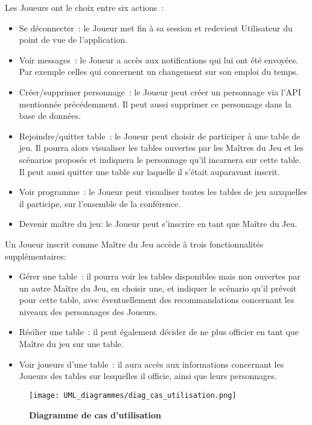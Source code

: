 \documentclass[11pt]{article}
\begin{document}
Les Joueurs ont le choix entre six actions~:
\begin{itemize}
    \item {Se déconnecter~: le Joueur met fin à sa session et redevient Utilisateur du point de vue de l'application.}
    \item{Voir messages~: le Joueur a accès aux notifications qui lui ont été envoyées. Par exemple celles qui concernent un changement sur son emploi du temps.}
    \item{Créer/supprimer personnage~: le Joueur peut créer un personnage via l'API mentionnée précédemment. Il peut aussi supprimer ce personnage dans la base de données.}
    \item{Rejoindre/quitter table~: le Joueur peut choisir de participer à une table de jeu. Il pourra alors visualiser les tables ouvertes par les Maîtres du Jeu et les scénarios proposés et indiquera le personnage qu'il incarnera sur cette table. Il peut aussi quitter une table sur laquelle il s'était auparavant inscrit.}
    \item{Voir programme~: le Joueur peut visualiser toutes les tables de jeu auxquelles il participe, sur l'ensemble de la conférence.}
    \item{Devenir maître du jeu: le Joueur peut s'inscrire en tant que Maître du Jeu.\\}
\end{itemize}

Un Joueur inscrit comme Maître du Jeu accède à trois fonctionnalités supplémentaires:
\begin{itemize}
    \item{Gérer une table~: il pourra voir les tables disponibles mais non ouvertes par un autre Maître du Jeu, en choisir une, et indiquer le scénario qu'il prévoit pour cette table, avec éventuellement des recommandations concernant les niveaux des personnages des Joueurs.}
    \item{Résilier une table~: il peut également décider de ne plus officier en tant que Maître du jeu sur une table.}
    \item{Voir joueurs d'une table~: il aura accès aux informations concernant les Joueurs des tables sur lesquelles il officie, ainsi que leurs personnages.\\}
\end{itemize}

\begin{figure}[H]
    \caption{\textbf{Diagramme de cas d'utilisation}}
    \label{UML_classe_pipeline}
    \centering
    \texttt{[image: UML\_diagrammes/diag\_cas\_utilisation.png]}
\end{figure}
\end{document}

